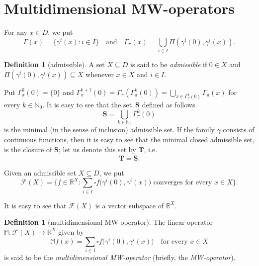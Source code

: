 \documentclass{amsart}
\theoremstyle{plain}%
\theoremstyle{definition}
\newtheorem{definition}[theorem]{Definition}
\theoremstyle{remark}
\begin{document}

\section{Multidimensional MW-operators}\label{section7}
For any $x\in D$, we put
\begin{equation*}
\Gamma(x)=\big\{\gamma^i(x):i\in I\big\}\quad\text{and}\quad 
\Gamma_\pi(x)=\bigcup_{i\in I}\Pi(\gamma^i(0),\gamma^i(x)).
\end{equation*}

\begin{definition}[admissible]\label{defAmisibleSet}
A set $X\subseteq D$ is said to be \emph{admissible} if $0\in X$ and $\Pi(\gamma^i(0),\gamma^i(x))\subseteq X$ whenever $x\in X$ and $i\in I$. 	
\end{definition}

Put $\Gamma_\pi^0(0)=\{0\}$ and $\Gamma_\pi^{k+1}(0)=\Gamma_\pi(\Gamma_\pi^k(0))=\bigcup_{x\in \Gamma_\pi^k(0)}\Gamma_\pi(x)$ for every $k\in\mathbb{N}_0$. It is easy to see that the set~$\textbf{S}$ defined as follows 
\begin{equation*}
\textbf{S}=\bigcup_{k\in\mathbb{N}_0}\Gamma_\pi^k(0)
\end{equation*}
is the minimal (in the sense of inclusion) admissible set. If the family $\gamma$ consists of continuous functions, then it is easy to see that the minimal closed admissible set, is the closure of $\textbf{S}$; let us denote this set by $\textbf{T}$, i.e. 
\begin{equation*}
\textbf{T}=\overline{\textbf{S}}.	
\end{equation*}

Given an admissible set $X\subseteq D$, we put
\begin{equation*}
\mathcal{F}(X)=\big\{f\in\mathbb{R}^X:\text{$\sum_{i\in I}\square f\big(\gamma^i(0),\gamma^i(x)\big)$ converges for every $x\in X$}\big\}.
\end{equation*}

It is easy to see that $\mathcal{F}(X)$ is a vector subspace of $\mathbb{R}^X$.

\begin{definition}[multidimensional MW\nobreakdash-operator]\label{defMWO}
The linear operator $\mathbb{M}\colon \mathcal{F}(X)\to \mathbb{R}^X$ given by
\begin{equation*}\label{equ:MWoperator}
\mathbb{M}f(x)=\sum_{i\in I}\square f\big(\gamma^i(0),\gamma^i(x)\big)\quad\text{for every } x\in X 
\end{equation*} 
is said to be the \emph{multidimensional MW\nobreakdash-operator} (briefly, the \emph{MW-operator}). 
\end{definition}
\end{document}
